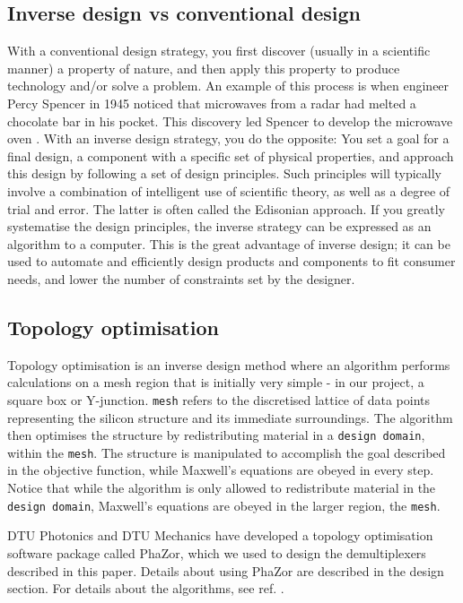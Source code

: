\subsection{Inverse design vs conventional design}

With a conventional design strategy, you first discover (usually in a scientific manner) a property of nature, and then apply this property to produce technology and/or solve a problem. An example of this process is when engineer Percy Spencer in 1945 noticed that microwaves from a radar had melted a chocolate bar in his pocket. This discovery led Spencer to develop the microwave oven \cite{wikiMicrowave}.
With an inverse design strategy, you do the opposite: You set a goal for a final design, a component with a specific set of physical properties, and approach this design by following a set of design principles. Such principles will typically involve a combination of intelligent use of scientific theory, as well as a degree of trial and error. The latter is often called the Edisonian approach. If you greatly systematise the design principles, the inverse strategy can be expressed as an algorithm to a computer. This is the great advantage of inverse design; it can be used to automate and efficiently design products and components to fit consumer needs, and lower the number of constraints set by the designer.

\subsection{Topology optimisation}

Topology optimisation is an inverse design method where an algorithm performs calculations on a mesh region that is initially very simple - in our project, a square box or Y-junction. \texttt{mesh} refers to the discretised lattice of data points representing the silicon structure and its immediate surroundings.
The algorithm then optimises the structure by redistributing material in a \texttt{design domain}, within the \texttt{mesh}. The structure is manipulated to accomplish the goal described in the objective function, while Maxwell's equations are obeyed in every step. Notice that while the algorithm is only allowed to redistribute material in the \texttt{design domain}, Maxwell's equations are obeyed in the larger region, the \texttt{mesh}.

DTU Photonics and DTU Mechanics have developed a topology optimisation software package called PhaZor, which we used to design the demultiplexers described in this paper. Details about using PhaZor are described in the design section. For details about the algorithms, see ref. .

